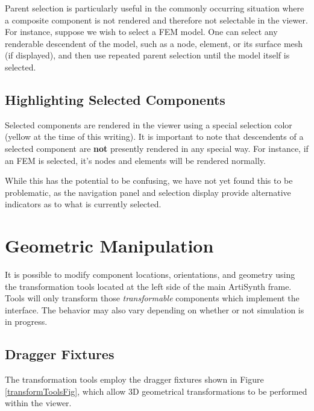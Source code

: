 \documentclass{article}
\begin{document}
Parent selection is particularly useful in the commonly occurring
situation where a composite component is not rendered and therefore
not selectable in the viewer. For instance, suppose we wish to select
a FEM model. One can select any renderable descendent of the model,
such as a node, element, or its surface mesh (if displayed), and then
use repeated parent selection until the model itself is selected.

\subsection{Highlighting Selected Components}

Selected components are rendered in the viewer using a special
selection color (yellow at the time of this writing). It is important
to note that descendents of a selected component are {\bf not} presently
rendered in any special way. For instance, if an FEM is selected, it's
nodes and elements will be rendered normally. 

While this has the potential to be confusing, we have not yet found
this to be problematic, as the navigation panel and selection display
provide alternative indicators as to what is currently selected.

\section{Geometric Manipulation}

It is possible to modify component locations, orientations, and
geometry using the transformation tools located at the left side of
the main ArtiSynth frame.  Tools will only transform those {\it
transformable} components which implement the
 interface. The
behavior may also vary depending on whether or not simulation is in
progress.

\subsection{Dragger Fixtures}
\label{draggerFixturesSec}

The transformation tools employ the dragger fixtures shown
in Figure \ref{transformToolsFig}, which allow 3D geometrical
transformations to be performed within the viewer.
\end{document}

